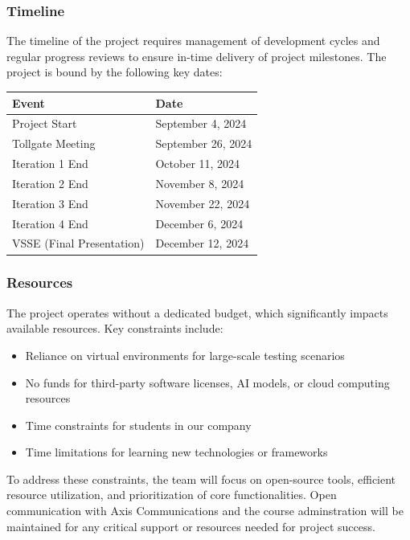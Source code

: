 \subsubsection{Timeline}
The timeline of the project requires management of development cycles and regular progress reviews to ensure in-time delivery of project milestones. The project is bound by the following key dates:
    
\begin{tabular}{ll}
    \textbf{Event} & \textbf{Date} \\
    \hline
        Project Start & September 4, 2024 \\
        Tollgate Meeting & September 26, 2024 \\
        Iteration 1 End & October 11, 2024 \\
        Iteration 2 End & November 8, 2024 \\
        Iteration 3 End & November 22, 2024 \\
        Iteration 4 End & December 6, 2024 \\
        VSSE (Final Presentation) & December 12, 2024 \\
\end{tabular}

    
\subsubsection{Resources}
The project operates without a dedicated budget, which significantly impacts available resources. Key constraints include:
    
\begin{itemize}
    \item Reliance on virtual environments for large-scale testing scenarios
    \item No funds for third-party software licenses, AI models, or cloud computing resources
    \item Time constraints for students in our company
    \item Time limitations for learning new technologies or frameworks
\end{itemize}
    
To address these constraints, the team will focus on open-source tools, efficient resource utilization, and prioritization of core functionalities. Open communication with Axis Communications and the course adminstration will be maintained for any critical support or resources needed for project success.

